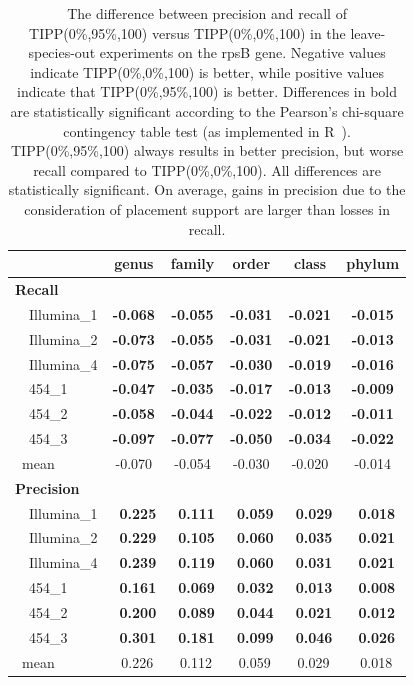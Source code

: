 \begin{table}[hptb]
\caption[Precision-Recall Differences between TIPP(0\%,95\%,100) versus TIPP(0\%,0\%,100) on the rpsB gene]{\label{tipp:difference.leaveout.rspb.sepp95.sepp}
The difference between precision and recall of TIPP(0\%,95\%,100) versus TIPP(0\%,0\%,100) in the leave-species-out experiments on the rpsB gene. 
Negative values indicate TIPP(0\%,0\%,100) is better, while positive values indicate that TIPP(0\%,95\%,100) is better.
Differences in bold are statistically significant according to the Pearson's chi-square contingency table test (as implemented in R~\cite{R}). 
TIPP(0\%,95\%,100) always results in better precision, but worse recall compared to TIPP(0\%,0\%,100). 
All differences are statistically significant.
On average, gains in precision due to the consideration of placement support are larger than losses in recall. }
\begin{center}
\begin{tabular}{|l||c|c|c|c|c|} \hline
\multicolumn{1}{|l||}{}&\multicolumn{1}{c|}{genus}&\multicolumn{1}{c|}{family}&\multicolumn{1}{c|}{order}&\multicolumn{1}{c|}{class}&\multicolumn{1}{c|}{phylum}\\ \hline
{\bf Recall}&&&&&\\
~~Illumina\_1&{\bf -0.068}&{\bf -0.055}&{\bf -0.031}&{\bf -0.021}&{\bf -0.015}\\ 
~~Illumina\_2&{\bf -0.073}&{\bf -0.055}&{\bf -0.031}&{\bf -0.021}&{\bf -0.013}\\ 
~~Illumina\_4&{\bf -0.075}&{\bf -0.057}&{\bf -0.030}&{\bf -0.019}&{\bf -0.016}\\ 
~~454\_1&{\bf -0.047}&{\bf -0.035}&{\bf -0.017}&{\bf -0.013}&{\bf -0.009}\\ 
~~454\_2&{\bf -0.058}&{\bf -0.044}&{\bf -0.022}&{\bf -0.012}&{\bf -0.011}\\ 
~~454\_3&{\bf -0.097}&{\bf -0.077}&{\bf -0.050}&{\bf -0.034}&{\bf -0.022}\\ 
~mean&-0.070&-0.054&-0.030&-0.020&-0.014\\ \hline
{\bf Precision}&&&&&\\
~~Illumina\_1&{\bf ~0.225}&{\bf ~0.111}&{\bf ~0.059}&{\bf ~0.029}&{\bf ~0.018}\\ 
~~Illumina\_2&{\bf ~0.229}&{\bf ~0.105}&{\bf ~0.060}&{\bf ~0.035}&{\bf ~0.021}\\ 
~~Illumina\_4&{\bf ~0.239}&{\bf ~0.119}&{\bf ~0.060}&{\bf ~0.031}&{\bf ~0.021}\\ 
~~454\_1&{\bf ~0.161}&{\bf ~0.069}&{\bf ~0.032}&{\bf ~0.013}&{\bf ~0.008}\\ 
~~454\_2&{\bf ~0.200}&{\bf ~0.089}&{\bf ~0.044}&{\bf ~0.021}&{\bf ~0.012}\\ 
~~454\_3&{\bf ~0.301}&{\bf ~0.181}&{\bf ~0.099}&{\bf ~0.046}&{\bf ~0.026}\\ 
~mean&~0.226&~0.112&~0.059&~0.029&~0.018\\ 
\hline
\end{tabular}
\end{center}
\end{table}

